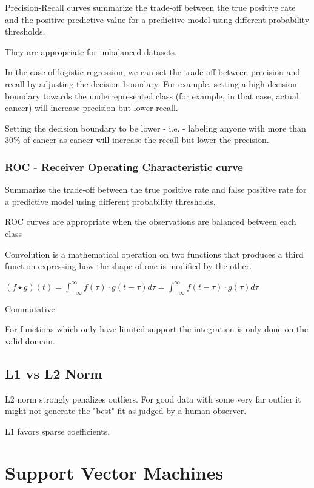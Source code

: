 Precision-Recall curves summarize the trade-off between the true positive rate and the positive predictive value for a predictive model using different probability thresholds.

They are appropriate for imbalanced datasets.

In the case of logistic regression, we can set the trade off between precision and recall by adjusting the decision boundary. For example, setting a high decision boundary towards the underrepresented class (for example, in that case, actual cancer) will increase precision but lower recall. 

Setting the decision boundary to be lower - i.e. - labeling anyone with more than 30\% of cancer as cancer will increase the recall but lower the precision.

\subsubsection{ROC -  Receiver Operating Characteristic curve}

Summarize the trade-off between the true positive rate and false positive rate for a predictive model using different probability thresholds.

ROC curves are appropriate when the observations are balanced between each class

Convolution is a mathematical operation on two functions that produces a third function expressing how the shape of one is modified by the other.

$(f\star g)(t) = \int_{-\infty}^{\infty} f(\tau)\cdot g(t-\tau)d\tau = \int_{-\infty}^{\infty} f(t-\tau)\cdot g(\tau)d\tau $

Commutative. 

For functions which only have limited support the integration is only done on the valid domain.

\subsection{L1 vs L2 Norm}

L2 norm strongly penalizes outliers. For good data with some very far outlier it might not generate the "best" fit as judged by a human observer.

L1 favors sparse coefficients.



\section{Support Vector Machines}

